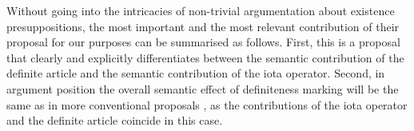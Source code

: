 \documentclass[output=paper,colorlinks,citecolor=brown]{langscibook}
\begin{document}
Without going into the intricacies of  non-trivial argumentation about existence presuppositions, the most important and the most relevant contribution of their proposal for our purposes can be summarised as follows. First, this is a proposal that clearly and explicitly differentiates between the semantic contribution of the definite article and the semantic contribution of the iota operator. Second, in argument position the overall semantic effect of definiteness marking will be the same as in more conventional proposals \citep[cf.][]{partee87, winter01, elbourne05, Heim2011}, as the contributions of the iota operator and the definite article coincide in this case.  





\end{document}
